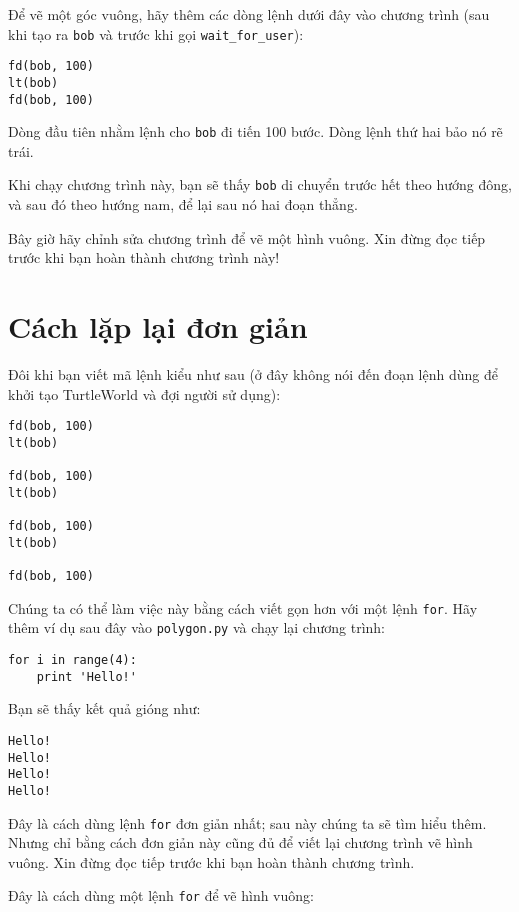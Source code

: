 \documentclass[11pt]{book}
\begin{document}
Để vẽ một góc vuông, hãy thêm các dòng lệnh dưới đây vào chương trình
(sau khi tạo ra {\tt bob} và trước khi gọi \verb"wait_for_user"):

\beforeverb
\begin{verbatim}
fd(bob, 100)
lt(bob)
fd(bob, 100)
\end{verbatim}
\afterverb
%
Dòng đầu tiên nhằm lệnh cho {\tt bob} đi tiến 100 bước.
Dòng lệnh thứ hai bảo nó rẽ trái.

Khi chạy chương trình này, bạn sẽ thấy {\tt bob} di chuyển trước hết
theo hướng đông, và sau đó theo hướng nam, để lại sau nó hai đoạn
thẳng.

Bây giờ hãy chỉnh sửa chương trình để vẽ một hình vuông. Xin đừng
đọc tiếp trước khi bạn hoàn thành chương trình này!


\section{Cách lặp lại đơn giản}
\label{lặp}

Đôi khi bạn viết mã lệnh kiểu như sau (ở đây không nói đến đoạn lệnh
dùng để khởi tạo TurtleWorld và đợi người sử dụng):

\begin{verbatim}
fd(bob, 100)
lt(bob)

fd(bob, 100)
lt(bob)

fd(bob, 100)
lt(bob)

fd(bob, 100)
\end{verbatim}
%
Chúng ta có thể làm việc này bằng cách viết gọn hơn với một lệnh {\tt for}.
Hãy thêm ví dụ sau đây vào {\tt polygon.py} và chạy lại chương trình:


\beforeverb
\begin{verbatim}
for i in range(4):
    print 'Hello!'
\end{verbatim}
\afterverb
%
Bạn sẽ thấy kết quả gióng như:

\beforeverb
\begin{verbatim}
Hello!
Hello!
Hello!
Hello!
\end{verbatim}
\afterverb
%
Đây là cách dùng lệnh {\tt for} đơn giản nhất; sau này chúng ta sẽ tìm 
hiểu thêm. Nhưng chỉ bằng cách đơn giản này cũng đủ để viết lại
chương trình vẽ hình vuông. Xin đừng đọc tiếp trước khi bạn hoàn thành
chương trình.


Đây là cách dùng một lệnh {\tt for} để vẽ hình vuông:
\end{document}
